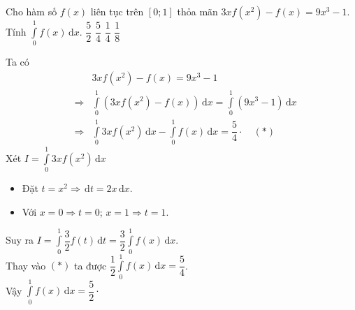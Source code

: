 \begin{ex}%
Cho hàm số $ f(x) $	 liên tục trên $ [0;1] $ thỏa mãn $ 3xf(x^2)-f(x)=9x^3-1 $. Tính $ \displaystyle \int\limits_{0}^1 f(x) \mathrm{\,d}x. $
	\choice
	{\True $ \dfrac{5}{2} $}
	{$ \dfrac{5}{4} $}
	{$ \dfrac{1}{4} $}
	{$ \dfrac{1}{8} $}
	\loigiai
	{Ta có \begin{eqnarray*}
&&3xf(x^2)-f(x)=9x^3-1\\
&\Rightarrow& \displaystyle \int\limits_{0}^{1} \left(3xf(x^2)-f(x)\right) \mathrm{\,d}x=\int\limits_{0}^{1} \left(9x^3-1\right) \mathrm{\,d}x\\
&\Rightarrow& \int\limits_{0}^{1} 3xf(x^2) \mathrm{\,d}x-\int\limits_{0}^{1} f(x) \mathrm{\,d}x=\dfrac{5}{4}\cdot \quad (*)
		\end{eqnarray*}
Xét $ I=\displaystyle \int\limits_{0}^{1} 3xf(x^2)\mathrm{\,d}x $	
\begin{itemize}
	\item Đặt $ t=x^2 \Rightarrow \mathrm{\,d}t=2x\mathrm{\,d}x$.
\item Với $ x=0 \Rightarrow t = 0$; $ x=1 \Rightarrow t=1. $
\end{itemize}
Suy ra $ I = \displaystyle \int\limits_{0}^{1} \dfrac{3}{2} f(t)\mathrm{\,d}t = \dfrac{3}{2} \int\limits_{0}^{1} f(x) \mathrm{\,d}x.$\\
Thay vào $ (*) $ ta được $\displaystyle \dfrac{1}{2} \int\limits_{0}^{1} f(x) \mathrm{\,d}x = \dfrac{5}{4} $.\\
Vậy $ \displaystyle \int\limits_{0}^{1} f(x) \mathrm{\,d}x=\dfrac{5}{2}\cdot $ 
	}
\end{ex}
